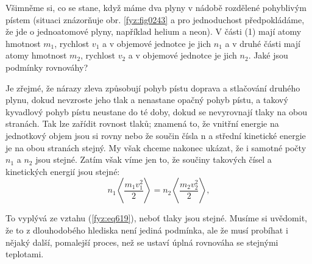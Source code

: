     Všimněme si, co se stane, když máme dva plyny v nádobě rozdělené pohyblivým pístem (situaci
    znázorňuje obr. \ref{fyz:fig0243} a pro jednoduchost předpokládáme, že jde o jednoatomové plyny,
    například helium a neon). V části (1) mají atomy hmotnost \(m_1\), rychlost \(v_1\) a v objemové
    jednotce je jich \(n_1\) a v druhé části mají atomy hmotnost \(m_2\), rychlost \(v_2\) a v
    objemové jednotce je jich \(n_2\). Jaké jsou podmínky rovnováhy?
    
    Je zřejmé, že nárazy zleva způsobují pohyb pístu doprava a stlačování druhého plynu, dokud
    nevzroste jeho tlak a nenastane opačný pohyb pístu, a takový kyvadlový pohyb pístu neustane do
    té doby, dokud se nevyrovnají tlaky na obou stranách. Tak lze zařídit rovnost tlaků; znamená to,
    že vnitřní energie na jednotkový objem jsou si rovny nebo že součin čísla n a střední kinetické
    energie je na obou stranách stejný. My však chceme nakonec ukázat, že i samotné počty \(n_1\) a
    \(n_2\) jsou stejné. Zatím však víme jen to, že součiny takových čísel a kinetických energií
    jsou stejné:    
    \begin{equation*}
      n_1\left\langle\frac{m_1v^2_1}{2}\right\rangle=n_2\left\langle\frac{m_2v^2_2}{2}\right\rangle,
    \end{equation*}
    
    To vyplývá ze vztahu (\ref{fyz:eq619}), neboť tlaky jsou stejné. Musíme si uvědomit, že to z
    dlouhodobého hlediska není jediná podmínka, ale že musí probíhat i nějaký další, pomalejší
    proces, než se ustaví úplná rovnováha se stejnými teplotami.
    
